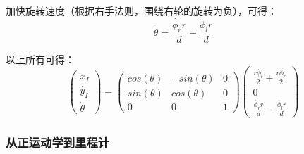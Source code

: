 
加快旋转速度（根据右手法则，围绕右轮的旋转为负），可得：
\begin{equation}
\dot{\theta}=\frac{\dot{\phi_r} r}{d}-\frac{\dot{\phi_l} r}{d}
\end{equation}

以上所有可得：
\begin{equation}\label{eq:diffwheels}
\left(\begin{array}{c} \dot{x_I}\\\dot{y_I}\\\dot{\theta}\end{array}\right)=\left(\begin{array}{ccc}
cos(\theta) & -sin(\theta) & 0 \\
sin(\theta) & cos(\theta) & 0 \\
0 & 0 & 1\end{array}\right)\left(\begin{array}{c}\frac{r\dot{\phi_l}}{2}+\frac{r\dot{\phi_r}}{2}\\0\\\frac{\dot{\phi_r} r}{d}-\frac{\dot{\phi_l} r}{d}\end{array}\right)
\end{equation}

\subsubsection{从正运动学到里程计}

